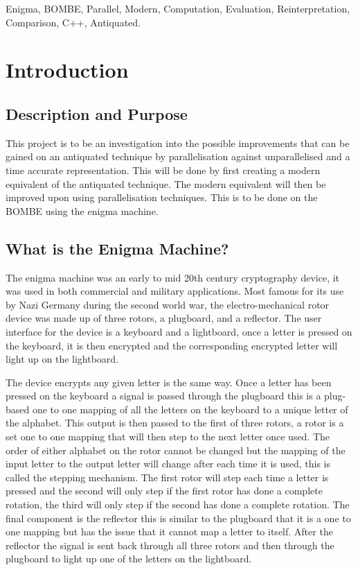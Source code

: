 \documentclass[12pt,a4paper]{article}
\begin{document}
\begin{keywords}
Enigma, BOMBE, Parallel, Modern, Computation, Evaluation, Reinterpretation, Comparison, C++, Antiquated.
\end{keywords}



\section{Introduction}

\subsection{Description and Purpose}

This project is to be an investigation into the possible improvements that can be gained on an antiquated technique by parallelisation against unparallelised and a time accurate representation. This will be done by first creating a modern equivalent of the antiquated technique. The modern equivalent will then be improved upon using parallelisation techniques. This is to be done on the BOMBE using the enigma machine.

\subsection{What is the Enigma Machine?}

The enigma machine was an early to mid 20th century cryptography device, it was used in both commercial and military applications. Most famous for its use by Nazi Germany during the second world war, the electro-mechanical rotor device was made up of three rotors, a plugboard, and a reflector. The user interface for the device is a keyboard and a lightboard, once a letter is pressed on the keyboard, it is then encrypted and the corresponding encrypted letter will light up on the lightboard. 

The device encrypts any given letter is the same way. Once a letter has been pressed on the keyboard a signal is passed through the plugboard this is a plug-based one to one mapping of all the letters on the keyboard to a unique letter of the alphabet. This output is then passed to the first of three rotors, a rotor is a set one to one mapping that will then step to the next letter once used. The order of either alphabet on the rotor cannot be changed but the mapping of the input letter to the output letter will change after each time it is used, this is called the stepping mechanism. The first rotor will step each time a letter is pressed and the second will only step if the first rotor has done a complete rotation, the third will only step if the second has done a complete rotation. The final component is the reflector this is similar to the plugboard that it is a one to one mapping but has the issue that it cannot map a letter to itself. After the reflector the signal is sent back through all three rotors and then through the plugboard to light up one of the letters on the lightboard. 
\end{document}
